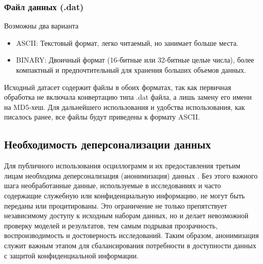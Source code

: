
\subsubsection{Файл данных (.dat)}\label{sec:ch3_dat_file}

Возможны два варианта

\begin{itemize}[itemsep=2pt,topsep=2pt]
  \item ASCII: Текстовый формат, легко читаемый, но занимает больше места.
  \item BINARY: Двоичный формат (16-битные или 32-битные целые числа), более компактный и предпочтительный для хранения больших объемов данных.
\end{itemize}

Исходный датасет содержит файлы в обоих форматах, так как первичная обработка не
включала конвертацию типа .dat файла, а лишь замену его имени на MD5-хеш. Для
дальнейшего использования и удобства использования, как писалось ранее, все файлы будут
приведены к формату ASCII.\par\vspace{0.2cm}

\subsection{Необходимость деперсонализации данных}\label{sec:ch3_depersonalization_necessity}

Для публичного использования осциллограмм и их предоставления третьим лицам необходима
деперсонализация (анонимизация) данных
\cite{bavr_bib_092_a_2014,bavr_bib_093_l_2002,bavr_bib_094_general_2016}. Без этого
важного шага необработанные данные, используемые в исследованиях и часто содержащие
служебную или конфиденциальную информацию, не могут быть переданы или процитированы. Это
ограничение не только препятствует независимому доступу к исходным наборам данных, но и
делает невозможной проверку моделей и результатов, тем самым подрывая прозрачность,
воспроизводимость и достоверность исследований. Таким образом, анонимизация служит
важным этапом для сбалансирования потребности в доступности данных с защитой
конфиденциальной информации.\par\vspace{0.2cm}

